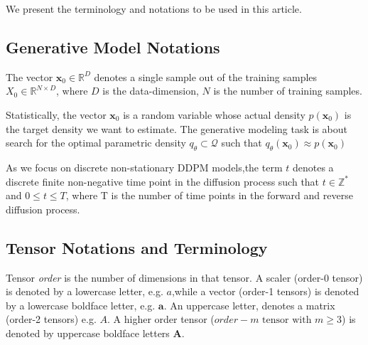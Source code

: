 \documentclass[11pt]{article}
\begin{document}
    We present the terminology and notations to be used in this article.

    \subsection{Generative Model Notations}\label{subsec:generative-model-notations}

    The vector $\mathbf{x}_0 \in \mathbb{R}^{D}$ denotes a single sample out of the training samples $X_0 \in \mathbb{R}^{N \times D}$,
    where $D$ is the data-dimension, $N$ is the number of training samples.

    Statistically, the vector $\mathbf{x}_0$ is a random variable whose actual density $p(\mathbf{x}_0)$
    is the target density we want to estimate.
    The generative modeling task is about search for the optimal parametric density $q_{\theta} \subset \mathcal{Q}$
    such that $q_{\theta}(\mathbf{x}_0) \approx p(\mathbf{x}_0)$


    As we focus on discrete non-stationary DDPM models,the term $t$ denotes a discrete finite non-negative time
    point in the diffusion process such that $t \in \mathbb{Z}^{*}$ and $0 \leq t \leq T$, where T is the number of
    time points in the forward and reverse diffusion process.
    \subsection{Tensor Notations and Terminology}\label{subsec:tensor-notations-and-terminology}
    Tensor \textit{order} is the number of dimensions in that tensor.
    A scaler (order-0 tensor) is denoted by a lowercase letter, e.g. $a$,while a vector (order-1 tensors) is denoted
    by a lowercase boldface letter, e.g. $\mathbf{a}$.
    An uppercase letter, denotes a matrix (order-2 tensors) e.g. $A$.
    A higher order tensor ($order-m \text{ tensor}\text{ with }m \geq 3$) is denoted by uppercase boldface letters $\mathbf{A}$.
\end{document}
